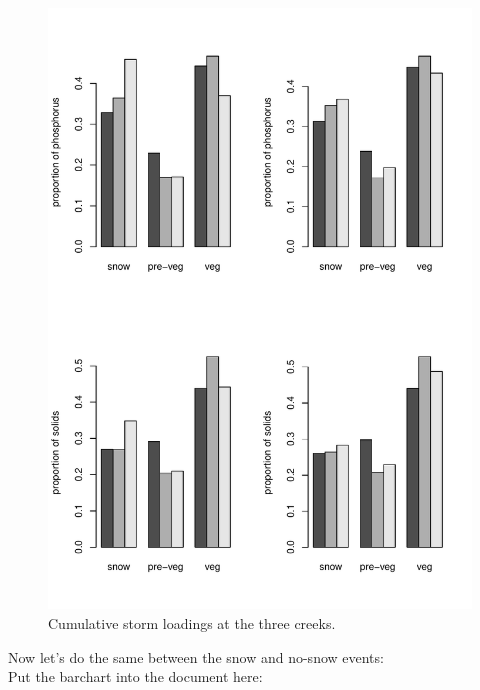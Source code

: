 \documentclass[12pt]{article}
\begin{document}
\begin{figure}[h!]
    \begin{center}
\includegraphics{loadings-fig2}
    \end{center}
    \vspace{-10mm}
    \caption{Cumulative storm loadings at the three creeks.\label{bars}}
\end{figure}



Now let's do the same between the snow and no-snow events:\\






Put the barchart into the document here:\\
\end{document}
